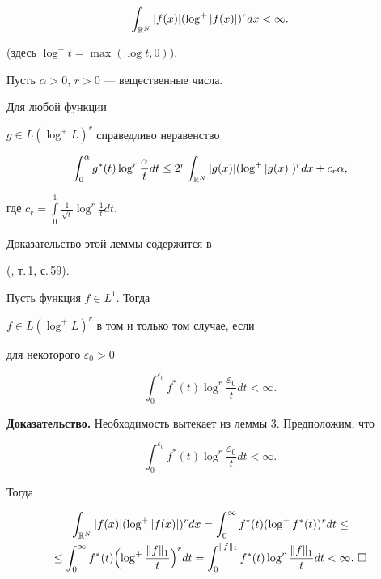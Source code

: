 $$ 


\int_{\Bbb R^N}|f(x)|(\log^+|f(x)|)^r dx <\infty. 


$$ 


(здесь $\log^+t=\max(\log t,0)$). 


 


\begin{lem} Пусть $\alpha>0$, $r>0$ --- вещественные числа. 


Для любой функции 


$g\in L(\log^+ L)^r$ справедливо неравенство 


\begin{equation} 


\int^\alpha_0 g^*(t)\log^r\frac{\alpha}{t}dt \le 


2^r\int_{\Bbb R^N}|g(x)|(\log^+|g(x)|)^r dx +c_r\alpha, 


\end{equation} 


где $c_r=\int\limits_0^1\frac{1}{\sqrt t}\log^r\frac{1}{t}dt$. 


\end{lem} 


 


Доказательство этой леммы содержится в 


(\cite{Zyg}, т.\,1, с.\,59). 


 


\begin{lem} Пусть функция $f\in L^1$. Тогда 


$f\in L(\log^+ L)^r$ в том и только том случае, если 


для некоторого $\varepsilon_0>0$ 


$$ 


\int_0^{\varepsilon_0}f^*(t)\log^r\frac{\varepsilon_0}{t}dt <\infty. 


$$ 


\end{lem} 


 


{\bf Доказательство.} Необходимость вытекает из леммы 3. Предположим, что 


$$ 


\int_0^{\varepsilon_0}f^*(t)\log^r\frac{\varepsilon_0}{t}dt <\infty. 


$$ 


Тогда 


\begin{gather*} 


\int_{\Bbb R^N}|f(x)|(\log^+|f(x)|)^r dx= 


\int_0^\infty f^*(t)(\log^+f^*(t))^r dt\le \\ 


% 


\le \int_0^\infty f^*(t) 


\Bigl(\log^+\frac{\|f\|_1}{t}\Bigr)^r dt = 


\int_0^{\|f\|_1}f^*(t)\log^r\frac{\|f\|_1}{t}dt <\infty. \ \square 


\end{gather*} 


